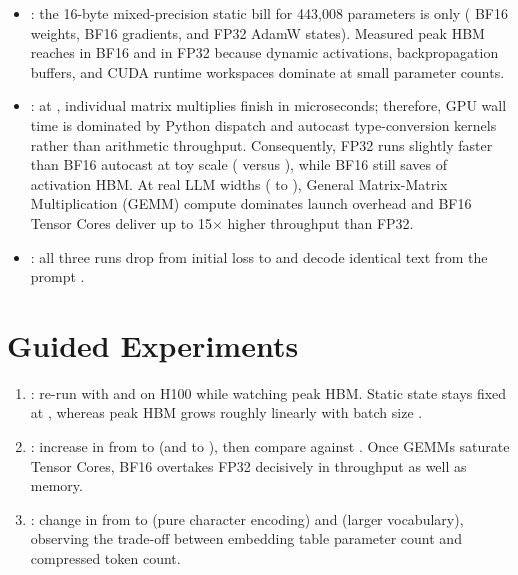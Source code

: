 \begin{itemize}
    \item {}: the 16-byte mixed-precision static bill for 443,008 parameters is only  ( BF16 weights,  BF16 gradients, and  FP32 AdamW states). Measured peak HBM reaches  in BF16 and  in FP32 because dynamic activations, backpropagation buffers, and CUDA runtime workspaces dominate at small parameter counts.
    \item {}: at , individual matrix multiplies finish in microseconds; therefore, GPU wall time is dominated by Python dispatch and autocast type-conversion kernels rather than arithmetic throughput. Consequently, FP32 runs slightly faster than BF16 autocast at toy scale ( versus ), while BF16 still saves  of activation HBM. At real LLM widths ( to ), General Matrix-Matrix Multiplication (GEMM) compute dominates launch overhead and BF16 Tensor Cores deliver up to 15$\times$ higher throughput than FP32.
    \item {}: all three runs drop from initial loss  to  and decode identical text from the prompt .
\end{itemize}

\section{Guided Experiments}

\begin{enumerate}
    \item {}: re-run with  and  on H100 while watching peak HBM. Static state stays fixed at , whereas peak HBM grows roughly linearly with batch size .
    \item {}: increase  in  from  to  (and  to ), then compare  against . Once GEMMs saturate Tensor Cores, BF16 overtakes FP32 decisively in throughput as well as memory.
    \item {}: change  in  from  to  (pure character encoding) and  (larger vocabulary), observing the trade-off between embedding table parameter count and compressed token count.
\end{enumerate}
